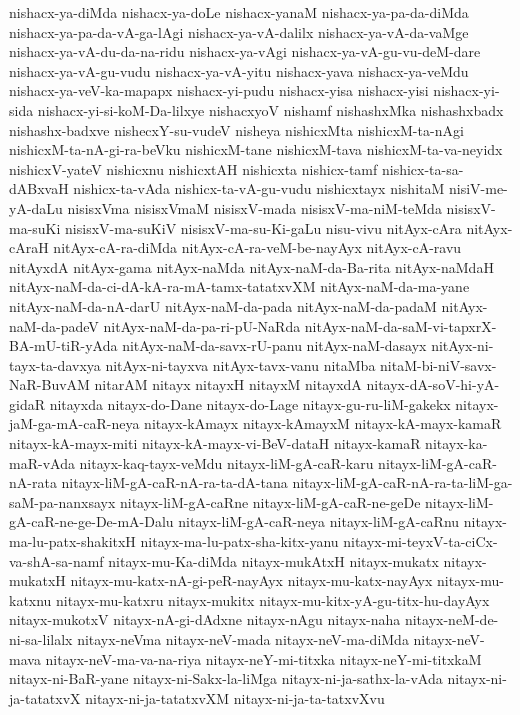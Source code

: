 {nishacx-ya-diMda
nishacx-ya-doLe
nishacx-yanaM
nishacx-ya-pa-da-diMda
nishacx-ya-pa-da-vA-ga-lAgi
nishacx-ya-vA-dalilx
nishacx-ya-vA-da-vaMge
nishacx-ya-vA-du-da-na-ridu
nishacx-ya-vAgi
nishacx-ya-vA-gu-vu-deM-dare
nishacx-ya-vA-gu-vudu
nishacx-ya-vA-yitu
nishacx-yava
nishacx-ya-veMdu
nishacx-ya-veV-ka-mapapx
nishacx-yi-pudu
nishacx-yisa
nishacx-yisi
nishacx-yi-sida
nishacx-yi-si-koM-Da-lilxye
nishacxyoV
nishamf
nishashxMka
nishashxbadx
nishashx-badxve
nishecxY-su-vudeV
nisheya
nishicxMta
nishicxM-ta-nAgi
nishicxM-ta-nA-gi-ra-beVku
nishicxM-tane
nishicxM-tava
nishicxM-ta-va-neyidx
nishicxV-yateV
nishicxnu
nishicxtAH
nishicxta
nishicx-tamf
nishicx-ta-sa-dABxvaH
nishicx-ta-vAda
nishicx-ta-vA-gu-vudu
nishicxtayx
nishitaM
nisiV-me-yA-daLu
nisisxVma
nisisxVmaM
nisisxV-mada
nisisxV-ma-niM-teMda
nisisxV-ma-suKi
nisisxV-ma-suKiV
nisisxV-ma-su-Ki-gaLu
nisu-vivu
nitAyx-cAra
nitAyx-cAraH
nitAyx-cA-ra-diMda
nitAyx-cA-ra-veM-be-nayAyx
nitAyx-cA-ravu
nitAyxdA
nitAyx-gama
nitAyx-naMda
nitAyx-naM-da-Ba-rita
nitAyx-naMdaH
nitAyx-naM-da-ci-dA-kA-ra-mA-tamx-tatatxvXM
nitAyx-naM-da-ma-yane
nitAyx-naM-da-nA-darU
nitAyx-naM-da-pada
nitAyx-naM-da-padaM
nitAyx-naM-da-padeV
nitAyx-naM-da-pa-ri-pU-NaRda
nitAyx-naM-da-saM-vi-tapxrX-BA-mU-tiR-yAda
nitAyx-naM-da-savx-rU-panu
nitAyx-naM-dasayx
nitAyx-ni-tayx-ta-davxya
nitAyx-ni-tayxva
nitAyx-tavx-vanu
nitaMba
nitaM-bi-niV-savx-NaR-BuvAM
nitarAM
nitayx
nitayxH
nitayxM
nitayxdA
nitayx-dA-soV-hi-yA-gidaR
nitayxda
nitayx-do-Dane
nitayx-do-Lage
nitayx-gu-ru-liM-gakekx
nitayx-jaM-ga-mA-caR-neya
nitayx-kAmayx
nitayx-kAmayxM
nitayx-kA-mayx-kamaR
nitayx-kA-mayx-miti
nitayx-kA-mayx-vi-BeV-dataH
nitayx-kamaR
nitayx-ka-maR-vAda
nitayx-kaq-tayx-veMdu
nitayx-liM-gA-caR-karu
nitayx-liM-gA-caR-nA-rata
nitayx-liM-gA-caR-nA-ra-ta-dA-tana
nitayx-liM-gA-caR-nA-ra-ta-liM-ga-saM-pa-nanxsayx
nitayx-liM-gA-caRne
nitayx-liM-gA-caR-ne-geDe
nitayx-liM-gA-caR-ne-ge-De-mA-Dalu
nitayx-liM-gA-caR-neya
nitayx-liM-gA-caRnu
nitayx-ma-lu-patx-shakitxH
nitayx-ma-lu-patx-sha-kitx-yanu
nitayx-mi-teyxV-ta-ciCx-va-shA-sa-namf
nitayx-mu-Ka-diMda
nitayx-mukAtxH
nitayx-mukatx
nitayx-mukatxH
nitayx-mu-katx-nA-gi-peR-nayAyx
nitayx-mu-katx-nayAyx
nitayx-mu-katxnu
nitayx-mu-katxru
nitayx-mukitx
nitayx-mu-kitx-yA-gu-titx-hu-dayAyx
nitayx-mukotxV
nitayx-nA-gi-dAdxne
nitayx-nAgu
nitayx-naha
nitayx-neM-de-ni-sa-lilalx
nitayx-neVma
nitayx-neV-mada
nitayx-neV-ma-diMda
nitayx-neV-mava
nitayx-neV-ma-va-na-riya
nitayx-neY-mi-titxka
nitayx-neY-mi-titxkaM
nitayx-ni-BaR-yane
nitayx-ni-Sakx-la-liMga
nitayx-ni-ja-sathx-la-vAda
nitayx-ni-ja-tatatxvX
nitayx-ni-ja-tatatxvXM
nitayx-ni-ja-ta-tatxvXvu
}
